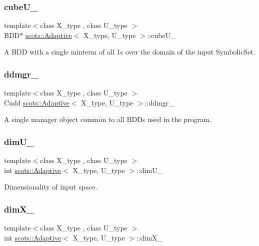 \subsubsection{\texorpdfstring{cube\+U\+\_\+}{cubeU\_}}
{\footnotesize\ttfamily template$<$class X\+\_\+type , class U\+\_\+type $>$ \\
B\+DD$\ast$ \hyperlink{classscots_1_1Adaptive}{scots\+::\+Adaptive}$<$ X\+\_\+type, U\+\_\+type $>$\+::cube\+U\+\_\+}

A B\+DD with a single minterm of all 1s over the domain of the input Symbolic\+Set. \mbox{\label{classscots_1_1Adaptive_a4d986f797368f4e1f74dd7d8a37df2dd}} 
\subsubsection{\texorpdfstring{ddmgr\+\_\+}{ddmgr\_}}
{\footnotesize\ttfamily template$<$class X\+\_\+type , class U\+\_\+type $>$ \\
Cudd \hyperlink{classscots_1_1Adaptive}{scots\+::\+Adaptive}$<$ X\+\_\+type, U\+\_\+type $>$\+::ddmgr\+\_\+}

A single manager object common to all B\+D\+Ds used in the program. \mbox{\label{classscots_1_1Adaptive_ac26b29e9c729fd641af851f87e2ee2b4}} 
\subsubsection{\texorpdfstring{dim\+U\+\_\+}{dimU\_}}
{\footnotesize\ttfamily template$<$class X\+\_\+type , class U\+\_\+type $>$ \\
int \hyperlink{classscots_1_1Adaptive}{scots\+::\+Adaptive}$<$ X\+\_\+type, U\+\_\+type $>$\+::dim\+U\+\_\+}

Dimensionality of input space. \mbox{\label{classscots_1_1Adaptive_a852e87d359ae3c0fe13493bac80f35f6}} 
\subsubsection{\texorpdfstring{dim\+X\+\_\+}{dimX\_}}
{\footnotesize\ttfamily template$<$class X\+\_\+type , class U\+\_\+type $>$ \\
int \hyperlink{classscots_1_1Adaptive}{scots\+::\+Adaptive}$<$ X\+\_\+type, U\+\_\+type $>$\+::dim\+X\+\_\+}

